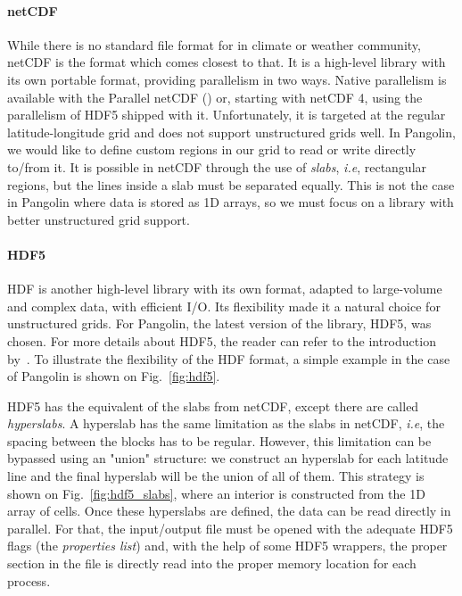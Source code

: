 \paragraph{netCDF}
While there is no standard file format for in climate or weather community,
\gls{netCDF} is the format which comes closest to that. It is a high-level
library with its own portable format, providing parallelism in two ways. Native
parallelism is available with the Parallel netCDF (\cite{Li2003}) or, starting
with netCDF 4, using the parallelism of HDF5 shipped with it. Unfortunately, it
is targeted at the regular latitude-longitude grid and does not support 
unstructured grids well. In Pangolin, we would like to define custom regions in our
grid to read or write directly to/from it. It is possible in netCDF through the
use of \textit{slabs}, \textit{i.e}, rectangular regions, but the lines inside a slab
must be separated equally. This is not the case in Pangolin where data is stored
as 1D arrays, so we must
focus on a library with better unstructured grid support.

\paragraph{HDF5}
\gls{HDF} is another high-level library with its own format, adapted to
large-volume and complex data, with efficient I/O. Its flexibility made it a
natural choice for unstructured grids. For Pangolin, the latest version of the
library, HDF5, was chosen. For more details about HDF5, the reader can refer to
the introduction by~\cite{Folk2011}. To illustrate the flexibility of the HDF
format, a simple example in the case of Pangolin is shown on Fig.~\ref{fig:hdf5}.

HDF5 has the equivalent of the slabs from netCDF, except there are called
\textit{hyperslabs}. A hyperslab has the same limitation as the slabs in netCDF,
\textit{i.e}, the spacing between the blocks has to be regular. However, this limitation can be
bypassed using an "union" structure: we construct an hyperslab for each latitude
line and the final hyperslab will be the union of all of them.  This strategy is
shown on Fig.~\ref{fig:hdf5_slabs}, where an interior is constructed from the 1D
array of cells. Once these hyperslabs are defined, the data can be read directly
in parallel. For that, the input/output file must be opened with the adequate
HDF5 flags (the \textit{properties list}) and, with the help of some HDF5
wrappers, the proper section in the file is directly read into the proper memory
location for each process.

